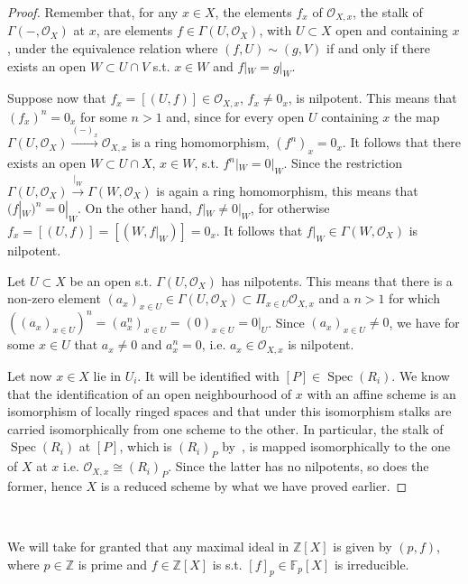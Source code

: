 \documentclass{article}
\newcommand{\numberset}{\mathbb}
\newcommand{\Z}{\numberset{Z}}
\newcommand{\F}{\numberset{F}}
\newcommand{\exercise}[1]{\noindent {\bf Exercise #1}}
\DeclareMathOperator{\Spec}{Spec}
\begin{document}
\begin{proof}
    Remember that, for any $x\in X$, the elements $f_x$ of $\mathcal{O}_{X,x}$,
    the stalk of $\Gamma(-,\mathcal{O}_X)$ at $x$, are elements $f\in\Gamma(U,
    \mathcal{O}_X)$, with $U\subset X$ open and containing $x$, under the
    equivalence relation where $(f,U)\sim (g,V)$ if and only if there exists
    an open $W\subset U\cap V$ s.t. $x\in W$ and $f|_W=g|_W$.

    Suppose now that $f_x=[(U,f)]\in\mathcal{O}_{X,x}$, $f_x\neq 0_x$, is
    nilpotent. This means that $(f_x)^n=0_x$ for some $n>1$ and, since for every
    open $U$ containing $x$ the map
    $\Gamma(U,\mathcal{O}_X)\xrightarrow{(-)_x}\mathcal{O}_{X,x}$ is a ring
    homomorphism, $(f^n)_x=0_x$. It follows that there exists an
    open $W\subset U\cap X$, $x\in W$, s.t. $f^n|_W=0|_W$. Since the restriction
    $\Gamma(U,\mathcal{O}_X)\xrightarrow{|_W}\Gamma(W,\mathcal{O}_X)$ is again a
    ring homomorphism, this means that $(f|_W)^n=0|_W$. On the other hand, $f|_W
    \neq 0|_W$, for otherwise $f_x=[(U,f)]=[(W,f|_W)]=0_x$. It follows that
    $f|_W\in\Gamma(W,\mathcal{O}_X)$ is nilpotent.
    
    Let $U\subset X$ be an open s.t. $\Gamma(U,\mathcal{O}_X)$ has nilpotents.
    This means that there is a non-zero element $(a_x)_{x\in U}\in\Gamma(U,
    \mathcal{O}_X)\subset\Pi_{x\in U}\mathcal{O}_{X,x}$ and a $n>1$ for which
    $((a_x)_{x\in U})^n=(a_x^n)_{x\in U}=(0)_{x\in U}=0|_U$. Since $(a_x)_{x\in U}
    \neq 0$, we have for some $x\in U$ that $a_x\neq 0$ and $a_x^n=0$, i.e.
    $a_x\in\mathcal{O}_{X,x}$ is nilpotent.
    
    Let now $x\in X$ lie in $U_i$. It will be identified with $[P]\in
    \Spec(R_i)$. We know that the identification
    of an open neighbourhood of $x$ with an affine scheme is an isomorphism of
    locally ringed spaces and that under this isomorphism stalks are carried
    isomorphically from one scheme to the other. In particular, the stalk of
    $\Spec(R_i)$ at $[P]$, which is $(R_i)_P$ by~\cite[p. 100]{Mum88}, is mapped
    isomorphically to the one of $X$ at $x$ i.e.
    $\mathcal{O}_{X,x}\cong (R_i)_P$. Since the latter has no nilpotents, so
    does the former, hence $X$ is a reduced scheme by what we have proved
    earlier.
\end{proof}


~\\
\exercise{4}

We will take for granted that any maximal ideal in $\Z[X]$ is given by $(p,f)$,
where $p\in\Z$ is prime and $f\in\Z[X]$ is s.t. $[f]_p\in\F_p[X]$ is
irreducible.
\end{document}
